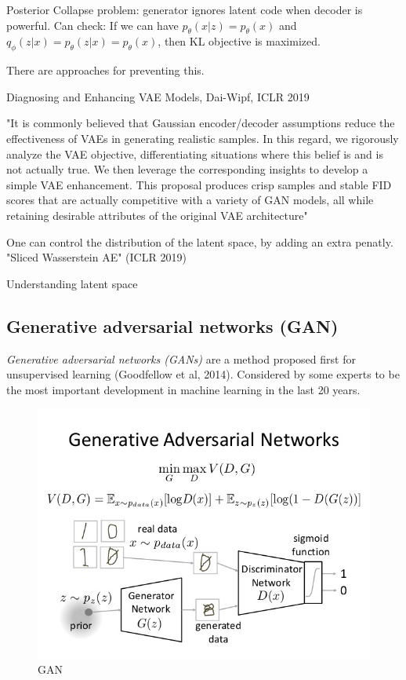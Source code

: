 \documentclass[english]{article}
\begin{document}
\item Posterior Collapse problem: generator ignores latent code when decoder is powerful. Can check: If we can have $p_\theta(x|z) = p_\theta(x)$ and $q_\phi(z|x)=p_\theta(z|x)=p_\theta(x)$, then KL objective is maximized. 

There are approaches for preventing this. 

\item Diagnosing and Enhancing VAE Models, Dai-Wipf, ICLR 2019

"It is commonly believed that Gaussian encoder/decoder assumptions reduce the
effectiveness of VAEs in generating realistic samples. In this regard, we rigorously analyze
the VAE objective, differentiating situations where this belief is and is not actually true.
We then leverage the corresponding insights to develop a simple VAE enhancement. This proposal
produces crisp samples and stable FID scores that are actually competitive with a variety
of GAN models, all while retaining desirable attributes of the original VAE architecture"

\item One can control the distribution of the latent space, by adding an extra penatly. "Sliced Wasserstein AE" (ICLR 2019)



\item Understanding latent space

\eenum 

 
\subsection{Generative adversarial networks (GAN)}

\benum
\item \emph{Generative adversarial networks (GANs)} are a method proposed first for unsupervised learning (Goodfellow et al, 2014). Considered by some experts to be the most important development in machine learning in the last 20 years. 
\begin{figure}
  \centering
  \includegraphics[scale=0.4]{gan.png}
    \caption{GAN}
    \label{gan}
\end{figure}
\end{document}
